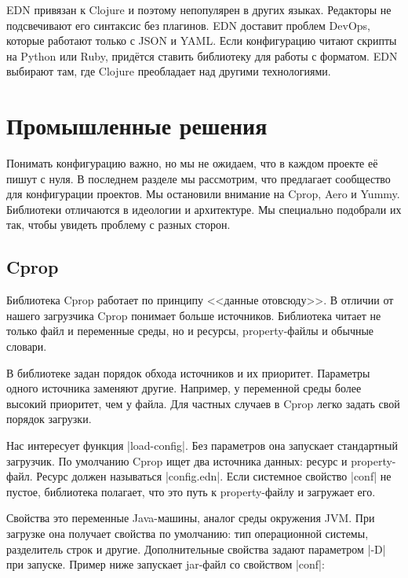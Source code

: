 EDN привязан к Clojure и поэтому непопулярен в других языках. Редакторы не
подсвечивают его синтаксис без плагинов. EDN доставит проблем DevOps, которые
работают только с JSON и YAML. Если конфигурацию читают скрипты на Python или
Ruby, прид\"{е}тся ставить библиотеку для работы с форматом. EDN выбирают там, где
Clojure преобладает над другими технологиями.

\section{Промышленные решения}

Понимать конфигурацию важно, но мы не ожидаем, что в каждом проекте е\"{е} пишут с
нуля. В последнем разделе мы рассмотрим, что предлагает сообщество для
конфигурации проектов. Мы остановили внимание на Cprop, Aero и Yummy. Библиотеки
отличаются в идеологии и архитектуре. Мы специально подобрали их так, чтобы
увидеть проблему с разных сторон.

\subsection{Cprop}


Библиотека Cprop работает по принципу
<<данные отовсюду>>. В отличии от нашего загрузчика Cprop понимает больше
источников. Библиотека читает не только файл и переменные среды, но и ресурсы,
property-файлы и обычные словари.

В библиотеке задан порядок обхода источников и их приоритет. Параметры одного
источника заменяют другие. Например, у переменной среды более высокий приоритет,
чем у файла. Для частных случаев в Cprop легко задать свой порядок загрузки.

Нас интересует функция \spverb|load-config|. Без параметров она запускает
стандартный загрузчик. По умолчанию Cprop ищет два источника данных: ресурс и
property-файл. Ресурс должен называться \spverb|config.edn|. Если системное
свойство \spverb|conf| не пустое, библиотека полагает, что это путь к
property-файлу и загружает его.

Свойства это переменные Java-машины, аналог среды окружения JVM. При загрузке
она получает свойства по умолчанию: тип операционной системы, разделитель строк
и другие. Дополнительные свойства задают параметром \spverb|-D| при
запуске. Пример ниже запускает jar-файл со свойством \spverb|conf|:


